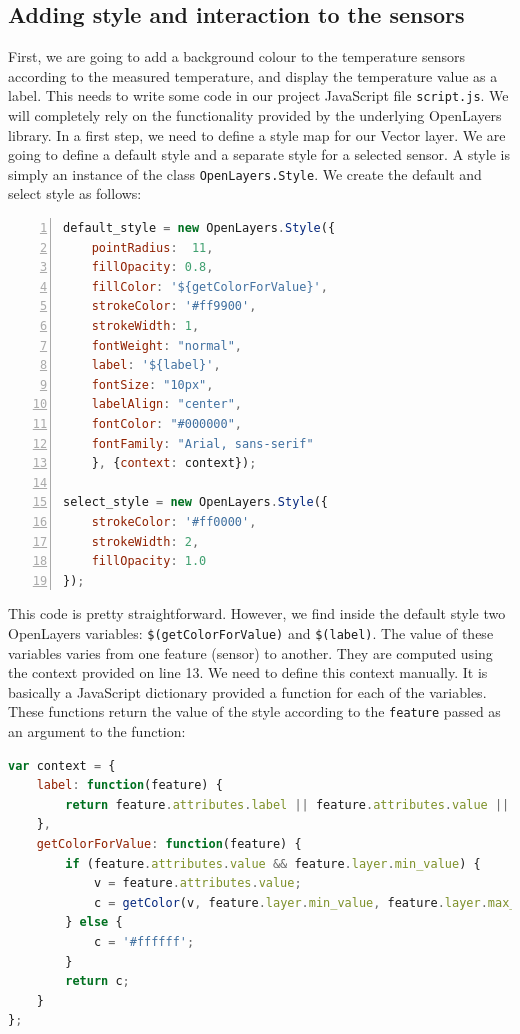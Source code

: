 \documentclass[11pt]{article}
\begin{document}
\subsection{Adding style and interaction to the sensors}

First, we are going to add a background colour to the temperature sensors according to the measured temperature, and display the temperature value as a label. This needs to write some code in our project JavaScript file \texttt{script.js}. We will completely rely on the functionality provided by the underlying OpenLayers library. In a first step, we need to define a style map for our Vector layer. We are going to define a default style and a separate style for a selected sensor. A style is simply an instance of the class \texttt{OpenLayers.Style}. We create the default and select style as follows:

\begin{lstlisting}[language=JavaScript, numbers=left, numberstyle=\footnotesize, numbersep=5pt]
default_style = new OpenLayers.Style({
    pointRadius:  11,
    fillOpacity: 0.8,
    fillColor: '${getColorForValue}',
    strokeColor: '#ff9900',
    strokeWidth: 1,
    fontWeight: "normal",
    label: '${label}',
    fontSize: "10px",
    labelAlign: "center",
    fontColor: "#000000",
    fontFamily: "Arial, sans-serif"
    }, {context: context});

select_style = new OpenLayers.Style({
    strokeColor: '#ff0000',
    strokeWidth: 2,
    fillOpacity: 1.0
});
\end{lstlisting}

This code is pretty straightforward. However, we find inside the default style two OpenLayers variables: \verb=$(getColorForValue)= and \verb=$(label)=. The value of these variables varies from one feature (sensor) to another. They are computed using the context provided on line 13. We need to define this context manually. It is basically a JavaScript dictionary provided a function for each of the variables. These functions return the value of the style according to the \texttt{feature} passed as an argument to the function:

\begin{lstlisting}[language=JavaScript]
var context = {
    label: function(feature) {
        return feature.attributes.label || feature.attributes.value || '';
    },
    getColorForValue: function(feature) {
        if (feature.attributes.value && feature.layer.min_value) {
            v = feature.attributes.value;
            c = getColor(v, feature.layer.min_value, feature.layer.max_value, "hex");
        } else {
            c = '#ffffff';
        }
        return c;
    }
};
\end{lstlisting}
\end{document}
